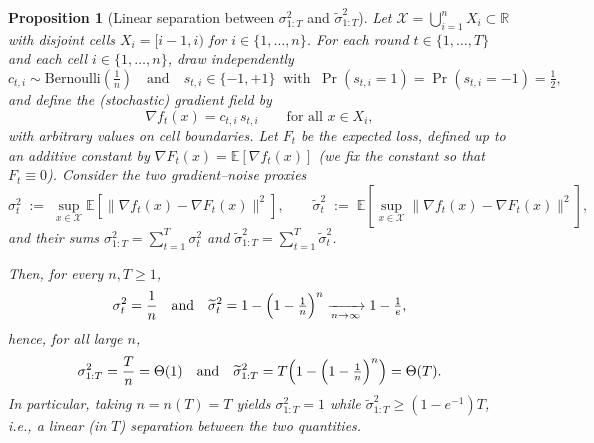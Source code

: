 \documentclass{article}
\theoremstyle{plain}
\newtheorem{proposition}[theorem]{Proposition}
\theoremstyle{definition}
\theoremstyle{remark}
\newcommand{\cX}{\mathcal{X}}
\renewcommand{\Bbb}{\mathbb}
\newcommand{\R}{{\Bbb R}}
\newcommand{\E}{{\Bbb E}}
\renewcommand{\tilde}{\widetilde}
\begin{document}
\begin{proposition}[Linear separation between $\sigma_{1:T}^2$ and $\tilde{\sigma}_{1:T}^2$]
Let $\cX=\bigcup_{i=1}^n X_i\subset\R$ with disjoint cells $X_i=[i-1,i)$ for $i\in\{1,\ldots,n\}$.
For each round $t\in\{1,\ldots,T\}$ and each cell $i\in\{1,\ldots,n\}$, draw independently
\begin{equation*}
c_{t,i}\sim\mathrm{Bernoulli}\!\left(\tfrac{1}{n}\right)
\quad\text{and}\quad
s_{t,i}\in\{-1,+1\}\ \text{ with }\ \Pr(s_{t,i}=1)=\Pr(s_{t,i}=-1)=\tfrac12,
\end{equation*}
and define the (stochastic) gradient field by
\begin{equation*}
\nabla f_t(x)=c_{t,i}\,s_{t,i}\qquad\text{for all }x\in X_i,
\end{equation*}
with arbitrary values on cell boundaries. Let $F_t$ be the expected loss, defined up to an additive constant by
$\nabla F_t(x)=\E[\nabla f_t(x)]$ (we fix the constant so that $F_t\equiv 0$).
Consider the two gradient–noise proxies
\begin{equation*}
\sigma_t^2 \;:=\; \sup_{x\in\cX}\E\!\left[\bigl\|\nabla f_t(x)-\nabla F_t(x)\bigr\|^2\right], 
\qquad
\tilde\sigma_t^2 \;:=\; \E\!\left[\sup_{x\in\cX}\bigl\|\nabla f_t(x)-\nabla F_t(x)\bigr\|^2\right],
\end{equation*}
and their sums $\sigma_{1:T}^2=\sum_{t=1}^T\sigma_t^2$ and $\tilde\sigma_{1:T}^2=\sum_{t=1}^T\tilde\sigma_t^2$.

Then, for every $n,T\ge 1$,
\begin{equation*}
\sigma_t^2=\frac{1}{n}
\quad\text{and}\quad
\tilde\sigma_t^2 = 1-\Bigl(1-\tfrac1n\Bigr)^{n}\xrightarrow[n\to\infty]{} 1-\tfrac{1}{e},
\end{equation*}
hence, for all large $n$,
\begin{equation*}
\sigma_{1:T}^2=\frac{T}{n}=\Theta(1)
\quad\text{and}\quad
\tilde\sigma_{1:T}^2 = T\!\left(1-\Bigl(1-\tfrac1n\Bigr)^n\right)=\Theta(T).
\end{equation*}
In particular, taking $n=n(T)=T$ yields $\sigma_{1:T}^2=1$ while $\tilde\sigma_{1:T}^2\ge (1-e^{-1})T$, i.e., a linear (in $T$) separation between the two quantities.
\end{proposition}
\end{document}
